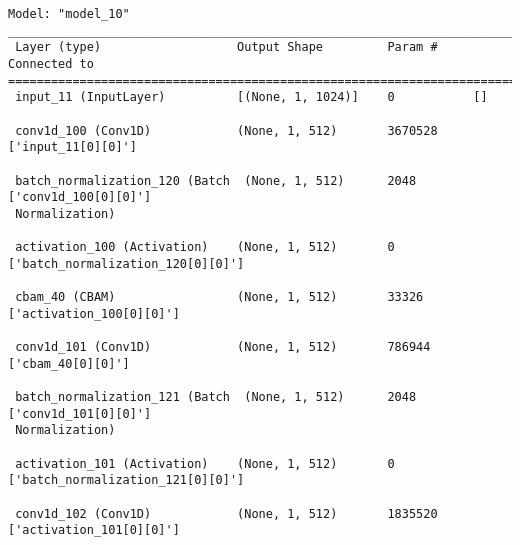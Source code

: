 \begin{lstlisting}
Model: "model_10"
__________________________________________________________________________________________________
 Layer (type)                   Output Shape         Param #     Connected to                     
==================================================================================================
 input_11 (InputLayer)          [(None, 1, 1024)]    0           []                               
                                                                                                  
 conv1d_100 (Conv1D)            (None, 1, 512)       3670528     ['input_11[0][0]']               
                                                                                                  
 batch_normalization_120 (Batch  (None, 1, 512)      2048        ['conv1d_100[0][0]']             
 Normalization)                                                                                   
                                                                                                  
 activation_100 (Activation)    (None, 1, 512)       0           ['batch_normalization_120[0][0]']
                                                                                                  
 cbam_40 (CBAM)                 (None, 1, 512)       33326       ['activation_100[0][0]']         
                                                                                                  
 conv1d_101 (Conv1D)            (None, 1, 512)       786944      ['cbam_40[0][0]']                
                                                                                                  
 batch_normalization_121 (Batch  (None, 1, 512)      2048        ['conv1d_101[0][0]']             
 Normalization)                                                                                   
                                                                                                  
 activation_101 (Activation)    (None, 1, 512)       0           ['batch_normalization_121[0][0]']
                                                                                                  
 conv1d_102 (Conv1D)            (None, 1, 512)       1835520     ['activation_101[0][0]']         
                                                                                                  

\end{lstlisting}
